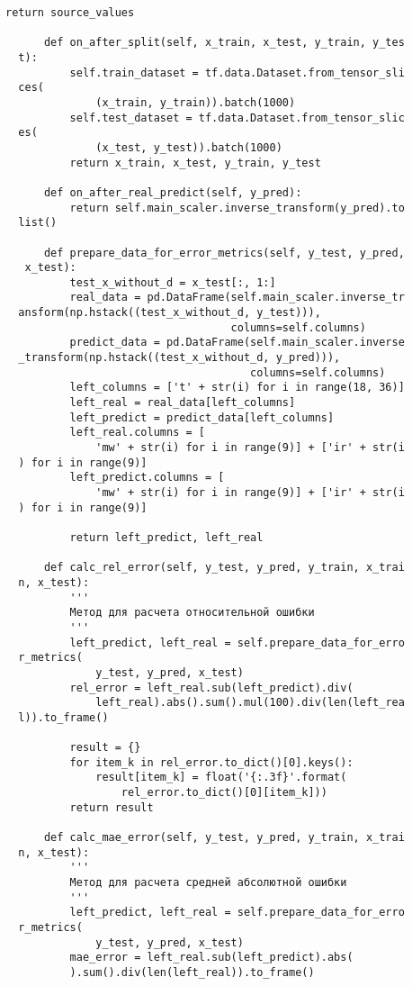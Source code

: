 \begin{lstlisting}[caption={Код программы для тестирования приложения с подключенной моделью регрессии экспериментальных данных}, label={ls:a:02}]
          return source_values
  
      def on_after_split(self, x_train, x_test, y_train, y_tes
  t):
          self.train_dataset = tf.data.Dataset.from_tensor_sli
  ces(
              (x_train, y_train)).batch(1000)
          self.test_dataset = tf.data.Dataset.from_tensor_slic
  es(
              (x_test, y_test)).batch(1000)
          return x_train, x_test, y_train, y_test
  
      def on_after_real_predict(self, y_pred):
          return self.main_scaler.inverse_transform(y_pred).to
  list()
  
      def prepare_data_for_error_metrics(self, y_test, y_pred,
   x_test):
          test_x_without_d = x_test[:, 1:]
          real_data = pd.DataFrame(self.main_scaler.inverse_tr
  ansform(np.hstack((test_x_without_d, y_test))),
                                   columns=self.columns)
          predict_data = pd.DataFrame(self.main_scaler.inverse
  _transform(np.hstack((test_x_without_d, y_pred))),
                                      columns=self.columns)
          left_columns = ['t' + str(i) for i in range(18, 36)]
          left_real = real_data[left_columns]
          left_predict = predict_data[left_columns]
          left_real.columns = [
              'mw' + str(i) for i in range(9)] + ['ir' + str(i
  ) for i in range(9)]
          left_predict.columns = [
              'mw' + str(i) for i in range(9)] + ['ir' + str(i
  ) for i in range(9)]
  
          return left_predict, left_real
  
      def calc_rel_error(self, y_test, y_pred, y_train, x_trai
  n, x_test):
          '''
          Метод для расчета относительной ошибки
          '''
          left_predict, left_real = self.prepare_data_for_erro
  r_metrics(
              y_test, y_pred, x_test)
          rel_error = left_real.sub(left_predict).div(
              left_real).abs().sum().mul(100).div(len(left_rea
  l)).to_frame()
  
          result = {}
          for item_k in rel_error.to_dict()[0].keys():
              result[item_k] = float('{:.3f}'.format(
                  rel_error.to_dict()[0][item_k]))
          return result
  
      def calc_mae_error(self, y_test, y_pred, y_train, x_trai
  n, x_test):
          '''
          Метод для расчета средней абсолютной ошибки
          '''
          left_predict, left_real = self.prepare_data_for_erro
  r_metrics(
              y_test, y_pred, x_test)
          mae_error = left_real.sub(left_predict).abs(
          ).sum().div(len(left_real)).to_frame()
  

\end{lstlisting}
